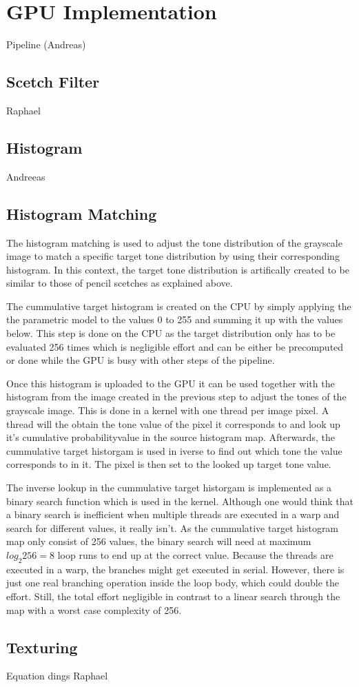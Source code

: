 \section{GPU Implementation} \label{gpu-implementation}
Pipeline (Andreas)

\subsection{Scetch Filter}
Raphael
\subsection{Histogram}
Andreeas
\subsection{Histogram Matching}
The histogram matching is used to adjust the tone distribution of the 
grayscale image to match a specific target tone distribution by using
their corresponding histogram. In this context, the target tone
distribution is artifically created to be similar to those of pencil
scetches as explained above.

The cummulative target histogram is created on the CPU by simply applying
the the parametric model to the values 0 to 255 and summing it up with
the values below.
This step is done on the CPU as the target distribution only has to
be evaluated 256 times which is negligible effort and can be either be
precomputed or done while the GPU is busy with other steps of the pipeline.

Once this histogram is uploaded to the GPU it can be used together with
the histogram from the image created in the previous step to adjust the
tones of the grayscale image. This is done in a kernel with one thread
per image pixel. A thread will the obtain the tone value of the pixel
it corresponds to and look up it's cumulative probabilityvalue in
the source histogram map.
Afterwards, the cummulative target historgam is used in iverse to find
out which tone the value corresponds to in it. The pixel is then set to
the looked up target tone value.

The inverse lookup in the cummulative target historgam is implemented
as a binary search function which is used in the kernel. Although
one would think that a binary search is inefficient when multiple threads
are executed in a warp and search for different values, it really isn't.
As the cummulative target histogram map only consist of 256 values,
the binary search will need at maximum $log_2 256=8$ loop runs to end
up at the correct value. Because the threads are executed in a warp,
the branches might get executed in serial. However, there is just one 
real branching operation inside the loop body, which could double the
effort. Still, the total effort negligible in contrast to a linear search
through the map with a worst case complexity of 256.

\subsection{Texturing}
Equation dings Raphael
